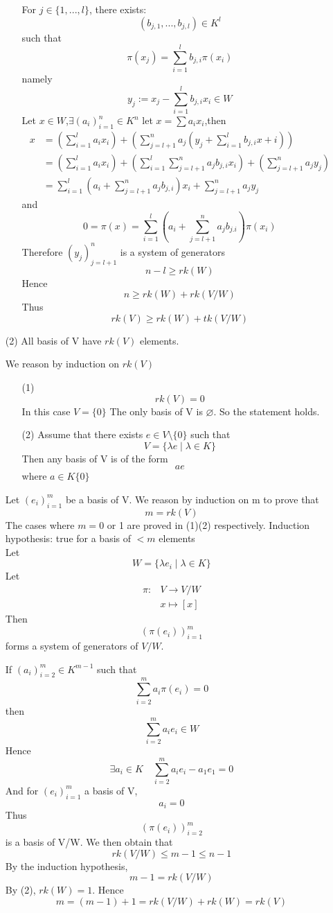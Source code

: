 \documentclass{book}
\begin{document}
\begin{itemize}
\begin{itemize}
            For $j\in \{1,...,l\}$, there exists:
            $$(b_{j,1},...,b_{j,l})\in K^l$$
            such that $$\pi(x_j)=\sum\limits_{i=1}^lb_{j,i}\pi(x_i)$$
            namely$$y_j:=x_j-\sum\limits_{i=1}^l b_{j,i}x_i\in W$$
            Let $x\in W$,$\exists (a_i)_{i=1}^n\in K^n$ let $x=\sum a_ix_i$,then
            $$\begin{aligned}
            x &=(\sum\limits_{i=1}^la_ix_i)+(\sum\limits_{j=l+1}^na_j(y_j+\sum\limits_{i=1}^lb_{j,i}x+i))\\
            &=(\sum\limits_{i=1}^la_ix_i)+(\sum\limits_{i=1}^l\sum\limits_{j=l+1}^na_jb_{j,i}x_i)+(\sum\limits_{j=l+1}^na_jy_j)\\
            & =\sum\limits_{i=1}^l(a_i+\sum\limits_{j=l+1}^na_jb_{j,i})x_i+\sum\limits_{j=l+1}^na_jy_j
            \end{aligned}$$
            and $$0=\pi(x)=\sum\limits_{i=1}^l(a_i+\sum\limits_{j=l+1}^na_jb_{j.i})\pi(x_i)$$
            Therefore $(y_j)_{j=l+1}^n$ is a system of generators$$n-l\geq rk(W)$$
            Hence $$n\geq rk(W)+rk(V/W)$$
            Thus $$rk(V)\geq rk(W)+tk(V/W)$$ 
    \end{itemize}
    \item[(2)]
        All basis of V have $rk(V)$ elements.

        We reason by induction on $rk(V)$
        \begin{itemize}
            \item[(1)] $$rk(V)=0$$
                In this case $V=\{0\}$ The only basis of V is $\varnothing$. So the statement holds.
            \item[(2)] Assume that there exists $e\in V\setminus\{0\}$ such that $$V=\{\lambda e\mid\lambda\in K\}$$
                Then any basis of V is of the form $$ae$$ where $a\in K\{0\}$
        \end{itemize}
        Let $(e_i)_{i=1}^m$ be a basis of V. We reason by induction on m to prove that $$m=rk(V)$$The cases where $m=0$ or 1 are proved in (1)(2) respectively. Induction hypothesis: true for a basis of $<m$ elements\\
        Let $$W=\{\lambda e_i\mid\lambda\in  K\}$$
        Let $$\begin{aligned}
            \pi:&V\rightarrow V/W\\&x\mapsto[x]
            \end{aligned}$$
        Then $$(\pi(e_i))_{i=1}^m$$ forms a system of generators of $V/W$.

        If $(a_i)_{i=2}^m\in K^{m-1}$ such that $$\sum\limits_{i=2}^ma_i\pi(e_i)=0$$
        then $$\sum\limits_{i=2}^ma_ie_i\in W$$
        Hence $$\exists a_i\in K\quad\sum\limits_{i=2}^ma_ie_i-a_1e_1=0$$
        And for  $(e_i)_{i=1}^m$ a basis of V,$$a_i=0$$
        Thus $$(\pi(e_i))_{i=2}^m$$ is a basis of V/W.
        We then obtain that $$rk(V/W)\leq m-1\leq n-1$$
        By the induction hypothesis, $$m-1=rk(V/W)$$
        By (2), $rk(W)=1$. Hence $$m=(m-1)+1=rk(V/W)+rk(W)=rk(V)$$ 
\end{itemize}
\end{document}

